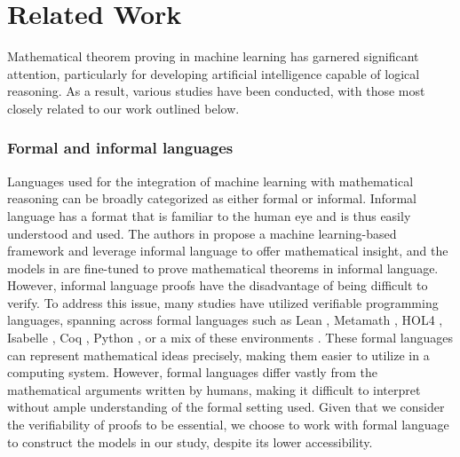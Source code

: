 \section{Related Work}
Mathematical theorem proving in machine learning has garnered significant attention, particularly for developing artificial intelligence capable of logical reasoning. As a result, various studies have been conducted, with those most closely related to our work outlined below.

\subsubsection{Formal and informal languages}

Languages used for the integration of machine learning with mathematical reasoning can be broadly categorized as either formal or informal.
Informal language has a format that is familiar to the human eye and is thus easily understood and used. 
The authors in \cite{math_machine_intution} propose a machine learning-based framework and leverage informal language to offer mathematical insight, and the models in \cite{tora, NaturalLanguage} are fine-tuned to prove mathematical theorems in informal language. 
However, informal language proofs have the disadvantage of being difficult to verify. To address this issue, many studies have utilized verifiable programming languages, spanning across formal languages such as Lean \cite{ProofNet,pact,curriculum,leandojo}, Metamath \cite{GPTf}, HOL4 \cite{TacticZero}, Isabelle \cite{thor,DraftSketchProve,lego}, Coq \cite{CoqGym}, Python \cite{codex}, or a mix of these environments \cite{HyperTree,copra}. 
These formal languages can represent mathematical ideas precisely, making them easier to utilize in a computing system. However, formal languages differ vastly from the mathematical arguments written by humans, making it difficult to interpret without ample understanding of the formal setting used. Given that we consider the verifiability of proofs to be essential, we choose to work with formal language to construct the models in our study, despite its lower accessibility.

